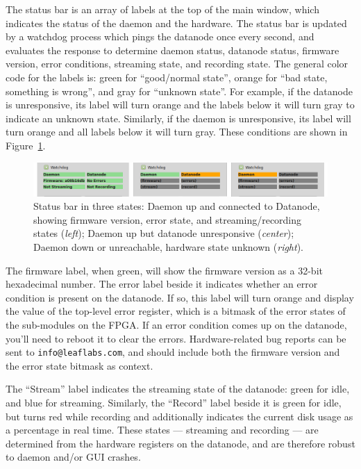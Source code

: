 The status bar is an array of labels at the top of the main window, which indicates the status of the daemon and the hardware. The status bar is updated by a watchdog process which pings the datanode once every second, and evaluates the response to determine daemon status, datanode status, firmware version, error conditions, streaming state, and recording state. The general color code for the labels is: green for ``good/normal state'', orange for ``bad state, something is wrong'', and gray for ``unknown state''. For example, if the datanode is unresponsive, its label will turn orange and the labels below it will turn gray to indicate an unknown state. Similarly, if the daemon is unresponsive, its label will turn orange and all labels below it will turn gray. These conditions are shown in Figure~\ref{fig_statusbar}.

\begin{figure}[h!]
\begin{center}
\includegraphics[width=17cm]{screenshots/statusbar_threestates.png}
\end{center}
\caption{Status bar in three states: Daemon up and connected to Datanode, showing firmware version, error state, and streaming/recording states (\textit{left}); Daemon up but datanode unresponsive (\textit{center}); Daemon down or unreachable, hardware state unknown (\textit{right}).}
\label{fig_statusbar}
\end{figure}

The firmware label, when green, will show the firmware version as a 32-bit hexadecimal number. The error label beside it indicates whether an error condition is present on the datanode. If so, this label will turn orange and display the value of the top-level error register, which is a bitmask of the error states of the sub-modules on the FPGA. If an error condition comes up on the datanode, you'll need to reboot it to clear the errors. Hardware-related bug reports can be sent to \texttt{info@leaflabs.com}, and should include both the firmware version and the error state bitmask as context.

The ``Stream'' label indicates the streaming state of the datanode: green for idle, and blue for streaming. Similarly, the ``Record'' label beside it is green for idle, but turns red while recording and additionally indicates the current disk usage as a percentage in real time. These states --- streaming and recording --- are determined from the hardware registers on the datanode, and are therefore robust to daemon and/or GUI crashes.

